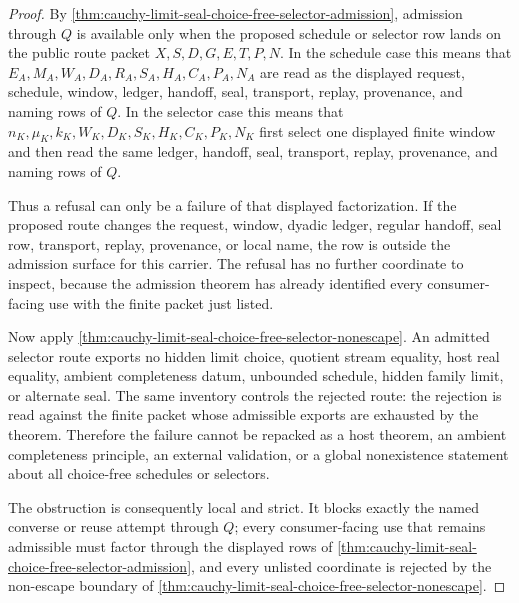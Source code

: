 \begin{proof}
By \autoref{thm:cauchy-limit-seal-choice-free-selector-admission}, admission through $Q$ is available only when the proposed schedule or selector row lands on the public route packet $X,S,D,G,E,T,P,N$. In the schedule case this means that $E_A,M_A,W_A,D_A,R_A,S_A,H_A,C_A,P_A,N_A$ are read as the displayed request, schedule, window, ledger, handoff, seal, transport, replay, provenance, and naming rows of $Q$. In the selector case this means that $n_K,\mu_K,k_K,W_K,D_K,S_K,H_K,C_K,P_K,N_K$ first select one displayed finite window and then read the same ledger, handoff, seal, transport, replay, provenance, and naming rows of $Q$.

Thus a refusal can only be a failure of that displayed factorization. If the proposed route changes the request, window, dyadic ledger, regular handoff, seal row, transport, replay, provenance, or local name, the row is outside the admission surface for this carrier. The refusal has no further coordinate to inspect, because the admission theorem has already identified every consumer-facing use with the finite packet just listed.

Now apply \autoref{thm:cauchy-limit-seal-choice-free-selector-nonescape}. An admitted selector route exports no hidden limit choice, quotient stream equality, host real equality, ambient completeness datum, unbounded schedule, hidden family limit, or alternate seal. The same inventory controls the rejected route: the rejection is read against the finite packet whose admissible exports are exhausted by the theorem. Therefore the failure cannot be repacked as a host theorem, an ambient completeness principle, an external validation, or a global nonexistence statement about all choice-free schedules or selectors.

The obstruction is consequently local and strict. It blocks exactly the named converse or reuse attempt through $Q$; every consumer-facing use that remains admissible must factor through the displayed rows of \autoref{thm:cauchy-limit-seal-choice-free-selector-admission}, and every unlisted coordinate is rejected by the non-escape boundary of \autoref{thm:cauchy-limit-seal-choice-free-selector-nonescape}.
\end{proof}
